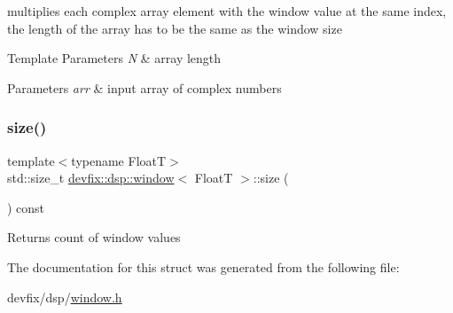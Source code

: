 multiplies each complex array element with the window value at the same index, the length of the array has to be the same as the window size 


\begin{DoxyTemplParams}{Template Parameters}
{\em N} & array length \\
\hline
\end{DoxyTemplParams}

\begin{DoxyParams}{Parameters}
{\em arr} & input array of complex numbers \\
\hline
\end{DoxyParams}
\mbox{\label{structdevfix_1_1dsp_1_1window_a24610f1f5682113df6e949575517d171}} 
\subsubsection{\texorpdfstring{size()}{size()}}
{\footnotesize\ttfamily template$<$typename FloatT$>$ \\
std\+::size\+\_\+t \hyperlink{structdevfix_1_1dsp_1_1window}{devfix\+::dsp\+::window}$<$ FloatT $>$\+::size (\begin{DoxyParamCaption}{ }\end{DoxyParamCaption}) const\hspace{0.3cm}{\ttfamily [inline]}}

\begin{DoxyReturn}{Returns}
count of window values 
\end{DoxyReturn}


The documentation for this struct was generated from the following file\+:\begin{DoxyCompactItemize}
\item 
devfix/dsp/\hyperlink{window_8h}{window.\+h}\end{DoxyCompactItemize}
